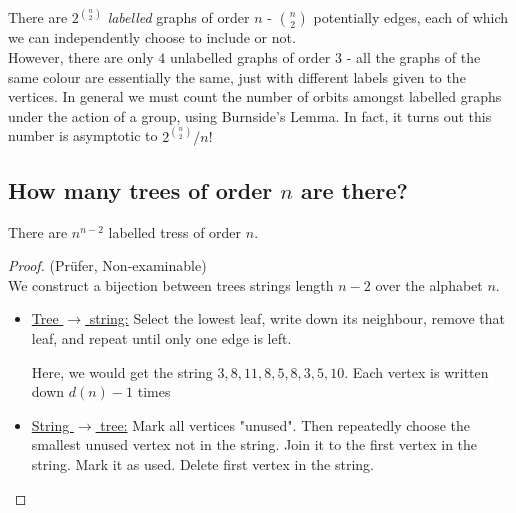 \documentclass[10pt,a4paper]{article}
\begin{document}
There are $2^{\binom{n}{2}}$ \emph{labelled} graphs of order $n$ - $\binom{n}{2}$ potentially edges, each of which we can independently choose to include or not.\\
However, there are only $4$ unlabelled graphs of order $3$ - all the graphs of the same colour are essentially the same, just with different labels given to the vertices. In general we must count the number of orbits amongst labelled graphs under the action of a group, using Burnside's Lemma. In fact, it turns out this number is asymptotic to $2^{\binom{n}{2}}/n!$

\subsection*{How many trees of order $n$ are there?}
\begin{theorem}[Cayley]
There are $n^{n-2}$ labelled tress of order $n$.
\end{theorem}
\begin{proof}(Pr\"ufer, Non-examinable)\\
We construct a bijection between trees strings length $n-2$ over the alphabet $n$.
\begin{itemize}
\item{\underline{Tree $\rightarrow$ string:}} Select the lowest leaf, write down its neighbour, remove that leaf, and repeat until only one edge is left.
\begin{center}
\end{center}
Here, we would get the string $3, 8, 11, 8, 5, 8, 3, 5, 10$. Each vertex is written down $d(n)-1$ times
\item{\underline{String $\rightarrow$ tree:}} Mark all vertices "unused". Then repeatedly choose the smallest unused vertex not in the string. Join it to the first vertex in the string. Mark it as used. Delete first vertex in the string.
\end{itemize}
\end{proof}
\end{document}
